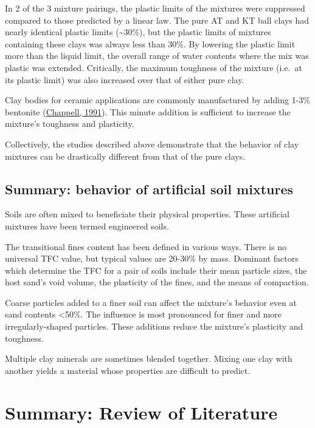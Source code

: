 \documentclass[
  letterpaper,
  openany]{book}
\begin{document}
In 2 of the 3 mixture pairings, the plastic limits of the mixtures were suppressed compared to those predicted by a linear law.
The pure AT and KT ball clays had nearly identical plastic limits (\textasciitilde30\%), but the plastic limits of mixtures containing these clays was always less than 30\%.
By lowering the plastic limit more than the liquid limit, the overall range of water contents where the mix was plastic was extended.
Critically, the maximum toughness of the mixture (i.e.~at its plastic limit) was also increased over that of either pure clay.

Clay bodies for ceramic applications are commonly manufactured by adding 1-3\% bentonite (\protect\hyperlink{ref-Chappell1991}{Chappell, 1991}).
This minute addition is sufficient to increase the mixture's toughness and plasticity.

Collectively, the studies described above demonstrate that the behavior of clay mixtures can be drastically different from that of the pure clays.

\hypertarget{summary-behavior-of-artificial-soil-mixtures}{%
\subsection{Summary: behavior of artificial soil mixtures}\label{summary-behavior-of-artificial-soil-mixtures}}

Soils are often mixed to beneficiate their physical properties.
These artificial mixtures have been termed engineered soils.

The transitional fines content has been defined in various ways.
There is no universal TFC value, but typical values are 20-30\% by mass.
Dominant factors which determine the TFC for a pair of soils include their mean particle sizes, the host sand's void volume, the plasticity of the fines, and the means of compaction.

Coarse particles added to a finer soil can affect the mixture's behavior even at sand contents \textless50\%.
The influence is most pronounced for finer and more irregularly-shaped particles.
These additions reduce the mixture's plasticity and toughness.

Multiple clay minerals are sometimes blended together.
Mixing one clay with another yields a material whose properties are difficult to predict.

\hypertarget{summary-review-of-literature}{%
\section{Summary: Review of Literature}\label{summary-review-of-literature}}
\end{document}
